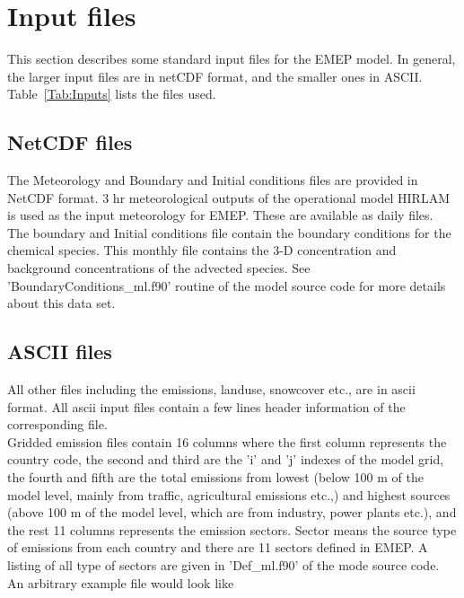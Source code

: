 \chapter{Input files}

This section describes some standard input files for the
EMEP model. In general, the larger input files
are in netCDF format, and the smaller ones in ASCII.
Table~\ref{Tab:Inputs} lists the files used.

\section{NetCDF files}

The Meteorology and Boundary and Initial conditions files are provided
in NetCDF format.  3 hr meteorological outputs of the 
operational model HIRLAM is used as the input
meteorology for EMEP.  These are available as daily files. \\

The boundary and Initial conditions file contain the boundary
conditions for the chemical species.  This monthly file contains the
3-D concentration and background concentrations  of the advected
species.  See 'BoundaryConditions\_ml.f90' routine of the model source
code for more details about this data set.  

\section{ASCII files}

All other files including the emissions, landuse, snowcover etc., are
in ascii format.  All ascii input files contain a few lines header
information of the corresponding file.   \\

Gridded emission files contain 16 columns where the first column
represents the country code, the second and third are the 'i' and 'j'
indexes of the model grid, the fourth and fifth are the total emissions from
lowest (below 100 m of the model level, mainly from traffic,
agricultural emissions etc.,) and highest sources (above 100 m of the
model level, which are from industry, power plants etc.),
and the rest 11 columns represents the emission sectors. Sector means
the source type of emissions from each country and there are 11
sectors defined in EMEP.  A listing of all type
of sectors are given in 'Def\_ml.f90' of the mode source code.   An arbitrary
example file would look like  \\

